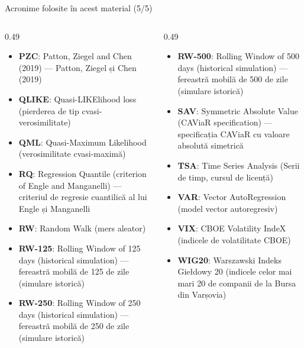 \begin{frame}{Acronime folosite în acest material (5/5)}
\begin{columns}[T]
\begin{column}{0.49\textwidth}
\begin{itemize}\setlength{\itemsep}{0pt}
    \item \textbf{PZC}: Patton, Ziegel and Chen (2019) — Patton, Ziegel și Chen (2019)
    \item \textbf{QLIKE}: Quasi-LIKElihood loss (pierderea de tip cvasi-verosimilitate)
    \item \textbf{QML}: Quasi-Maximum Likelihood (verosimilitate cvasi-maximă)
    \item \textbf{RQ}: Regression Quantile (criterion of Engle and Manganelli) — criteriul de regresie cuantilică al lui Engle și Manganelli
    \item \textbf{RW}: Random Walk (mers aleator)
    \item \textbf{RW-125}: Rolling Window of 125 days (historical simulation) — fereastră mobilă de 125 de zile (simulare istorică)
    \item \textbf{RW-250}: Rolling Window of 250 days (historical simulation) — fereastră mobilă de 250 de zile (simulare istorică)
\end{itemize}
\end{column}
\begin{column}{0.49\textwidth}
\begin{itemize}\setlength{\itemsep}{0pt}
    \item \textbf{RW-500}: Rolling Window of 500 days (historical simulation) — fereastră mobilă de 500 de zile (simulare istorică)
    \item \textbf{SAV}: Symmetric Absolute Value (CAViaR specification) — specificația CAViaR cu valoare absolută simetrică
    \item \textbf{TSA}: Time Series Analysis (Serii de timp, cursul de licență)
    \item \textbf{VAR}: Vector AutoRegression (model vector autoregresiv)
    \item \textbf{VIX}: CBOE Volatility IndeX (indicele de volatilitate CBOE)
    \item \textbf{WIG20}: Warszawski Indeks Giełdowy 20 (indicele celor mai mari 20 de companii de la Bursa din Varșovia)
\end{itemize}
\end{column}
\end{columns}
\end{frame}

